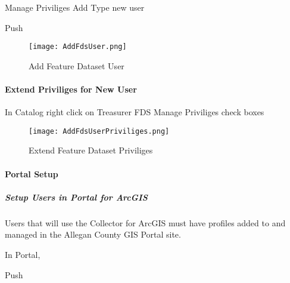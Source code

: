   {\rtArrow} Manage { \rtArrow} Priviliges { \rtArrow} Add { \rtArrow} Type new user { \rtArrow}

 \vspace{.25in}

 {\btn Push }
  \vspace{.25in}

  \begin{figure}[h!]
  \centering
      \texttt{[image: AddFdsUser.png]}
  \caption{Add Feature Dataset User}
  \end{figure}
  \clearpage
  \paragraph[Extend Priviliges for New User]{\Large Extend Priviliges for New User\texorpdfstring{\\}{}}
  \vspace{.5in}

  In Catalog {\rtArrow} right click on Treasurer FDS {\rtArrow} Manage {\rtArrow} Priviliges {\rtArrow} check boxes
  \vspace{.5in}

  \begin{figure}[h!]
  \centering
      \texttt{[image: AddFdsUserPriviliges.png]}
  \caption{Extend Feature Dataset Priviliges}
  \end{figure}
  \clearpage
 \paragraph{Portal Setup}

 \subparagraph{Setup Users in Portal for ArcGIS}
  \vspace{.5in}

  \noindent Users that will use the Collector for ArcGIS must have profiles added to and managed in the Allegan County GIS Portal site.
  \vspace{.5in}

  In Portal, {\rtArrow} 

 \vspace{.2in}

 {\btn Push }

